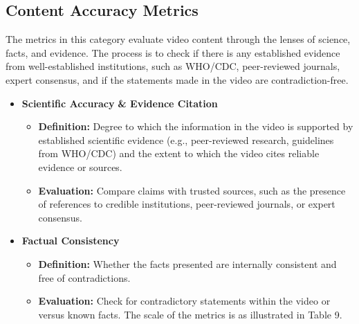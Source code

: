 \documentclass[]{article}
\begin{document}
\subsection{Content Accuracy Metrics}
The metrics in this category evaluate video content through the lenses of science, facts, and evidence. The process is to check if there is any established evidence from well-established institutions, such as WHO/CDC, peer-reviewed journals, expert consensus, and if the statements made in the video are contradiction-free.
\begin{itemize}
\item
  \textbf{Scientific Accuracy} \textbf{\& Evidence Citation}
\begin{itemize}
\item
  \textbf{Definition:} Degree to which the information in the video is
  supported by established scientific evidence (e.g., peer-reviewed
  research, guidelines from WHO/CDC) and the extent to which the video cites
  reliable evidence or sources.
\item
  \textbf{Evaluation:} Compare claims with trusted sources, such as the presence of references to credible institutions, peer-reviewed
  journals, or expert consensus.
  \end{itemize}

\item
  \textbf{Factual Consistency}
  \begin{itemize}
     

  \item
    \textbf{Definition:} Whether the facts presented are internally
    consistent and free of contradictions.
\item
  \textbf{Evaluation:} Check for contradictory statements within the video or versus known facts.
  The scale of the metrics is as illustrated in Table 9.
    \end{itemize}
\end{itemize}
\end{document}
